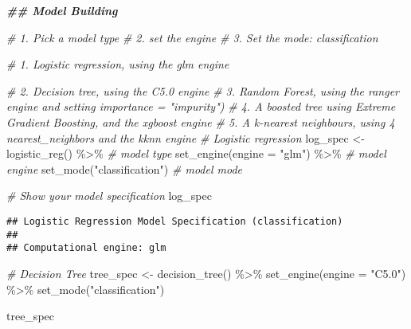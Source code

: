 \documentclass[
]{article}
\newenvironment{Shaded}{\begin{snugshade}}{\end{snugshade}}
\newcommand{\AttributeTok}[1]{\textcolor[rgb]{0.77,0.63,0.00}{#1}}
\newcommand{\CommentTok}[1]{\textcolor[rgb]{0.56,0.35,0.01}{\textit{#1}}}
\newcommand{\DocumentationTok}[1]{\textcolor[rgb]{0.56,0.35,0.01}{\textbf{\textit{#1}}}}
\newcommand{\FunctionTok}[1]{\textcolor[rgb]{0.00,0.00,0.00}{#1}}
\newcommand{\NormalTok}[1]{#1}
\newcommand{\OtherTok}[1]{\textcolor[rgb]{0.56,0.35,0.01}{#1}}
\newcommand{\SpecialCharTok}[1]{\textcolor[rgb]{0.00,0.00,0.00}{#1}}
\newcommand{\StringTok}[1]{\textcolor[rgb]{0.31,0.60,0.02}{#1}}
\begin{document}
\begin{Shaded}
\begin{Highlighting}[]
\DocumentationTok{\#\# Model Building }

\CommentTok{\# 1. Pick a \textasciigrave{}model type\textasciigrave{}}
\CommentTok{\# 2. set the \textasciigrave{}engine\textasciigrave{}}
\CommentTok{\# 3. Set the \textasciigrave{}mode\textasciigrave{}:  classification}


\CommentTok{\# 1. Logistic regression, using the \textasciigrave{}glm\textasciigrave{} engine}

\CommentTok{\# 2. Decision tree, using the \textasciigrave{}C5.0\textasciigrave{} engine}
\CommentTok{\# 3. Random Forest, using  the \textasciigrave{}ranger\textasciigrave{} engine and setting \textasciigrave{}importance = "impurity"\textasciigrave{})  }
\CommentTok{\# 4. A boosted tree using Extreme Gradient Boosting, and the \textasciigrave{}xgboost\textasciigrave{} engine}
\CommentTok{\# 5. A k{-}nearest neighbours,  using 4 nearest\_neighbors and the \textasciigrave{}kknn\textasciigrave{} engine }
\CommentTok{\# Logistic regression}
\NormalTok{log\_spec }\OtherTok{\textless{}{-}}  \FunctionTok{logistic\_reg}\NormalTok{() }\SpecialCharTok{\%\textgreater{}\%}  \CommentTok{\# model type}
  \FunctionTok{set\_engine}\NormalTok{(}\AttributeTok{engine =} \StringTok{"glm"}\NormalTok{) }\SpecialCharTok{\%\textgreater{}\%}  \CommentTok{\# model engine}
  \FunctionTok{set\_mode}\NormalTok{(}\StringTok{"classification"}\NormalTok{) }\CommentTok{\# model mode}

\CommentTok{\# Show your model specification}
\NormalTok{log\_spec}
\end{Highlighting}
\end{Shaded}

\begin{verbatim}
## Logistic Regression Model Specification (classification)
## 
## Computational engine: glm
\end{verbatim}

\begin{Shaded}
\begin{Highlighting}[]
\CommentTok{\# Decision Tree}
\NormalTok{tree\_spec }\OtherTok{\textless{}{-}} \FunctionTok{decision\_tree}\NormalTok{() }\SpecialCharTok{\%\textgreater{}\%}
  \FunctionTok{set\_engine}\NormalTok{(}\AttributeTok{engine =} \StringTok{"C5.0"}\NormalTok{) }\SpecialCharTok{\%\textgreater{}\%}
  \FunctionTok{set\_mode}\NormalTok{(}\StringTok{"classification"}\NormalTok{)}

\NormalTok{tree\_spec}
\end{Highlighting}
\end{Shaded}
\end{document}
